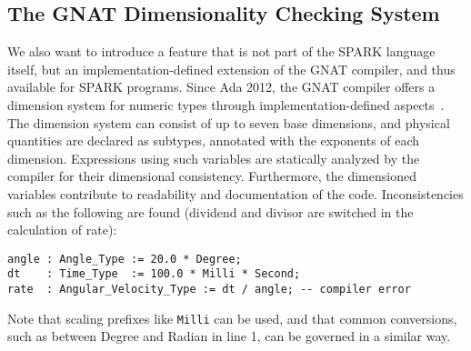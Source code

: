 \subsection{The GNAT Dimensionality Checking System}
We also want to introduce a feature that is not part of the SPARK
language itself, but an implementation-defined extension of the GNAT compiler, and thus available for SPARK programs. 
%
%
Since Ada 2012, the GNAT compiler offers a dimension system for numeric types through implementation-defined aspects~\cite{Schonberg:2012:ISD:2402676.2402692}. 
The dimension system can consist of up to seven base dimensions, %
and physical quantities are declared as subtypes, annotated with the exponents of each dimension.
Expressions using such variables are statically analyzed by the compiler for their dimensional consistency.
Furthermore, the dimensioned variables contribute to readability and documentation of the code. Inconsistencies such as the following are found (dividend and divisor are switched in the calculation of rate):

\vspace{-1mm}\begin{lstlisting}[name=units]
angle : Angle_Type := 20.0 * Degree;         
dt    : Time_Type  := 100.0 * Milli * Second;
rate  : Angular_Velocity_Type := dt / angle; -- compiler error
\end{lstlisting}\vspace{-1mm}
Note that scaling prefixes like \lstinline$Milli$ can be used, and
that common conversions, such as between Degree and Radian in line 1, can be governed in a similar way.

